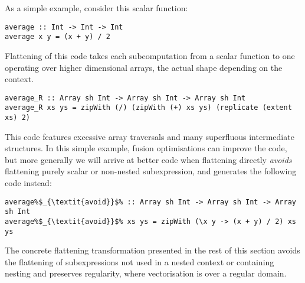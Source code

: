As a simple example, consider this scalar function:
%
\begin{lstlisting}
average :: Int -> Int -> Int
average x y = (x + y) / 2
\end{lstlisting}
%
Flattening of this code takes each subcomputation from a scalar function to one operating over higher dimensional arrays, the actual shape depending on the context.
%
\begin{lstlisting}[style=ndp]
average_R :: Array sh Int -> Array sh Int -> Array sh Int
average_R xs ys = zipWith (/) (zipWith (+) xs ys) (replicate (extent xs) 2)
\end{lstlisting}
%
This code features excessive array traversals and many superfluous intermediate structures. In this simple example, fusion optimisations can improve the code, but more generally we will arrive at better code when flattening directly \emph{avoids} flattening purely scalar or non-nested subexpression, and generates the following code instead:
%
\begin{lstlisting}
average%$_{\textit{avoid}}$% :: Array sh Int -> Array sh Int -> Array sh Int
average%$_{\textit{avoid}}$% xs ys = zipWith (\x y -> (x + y) / 2) xs ys
\end{lstlisting}

The concrete flattening transformation presented in the rest of this section avoids the flattening of subexpressions not used in a nested context or containing nesting and preserves regularity, where vectorisation is over a regular domain.





